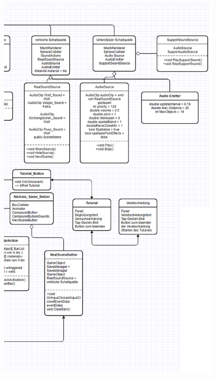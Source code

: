 \documentclass[a4paper,12pt]{scrreprt}
\begin{document}
\begin{figure}[H]
\centering
\includegraphics[width = 21cm, height = 26cm]{UML_3.png}
\end{figure} 
\end{document}
